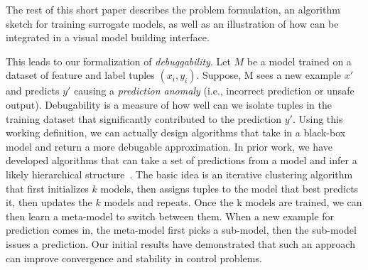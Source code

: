 The rest of this short paper describes the \sys problem formulation, an algorithm sketch for training surrogate models, as well as an illustration of how \sys can be integrated in a visual model building interface.


This leads to our formalization of \emph{debuggability}.
Let $M$ be a model trained on a dataset of feature and label tuples $(x_i,y_i)$.
Suppose, M sees a new example $x'$ and predicts $y'$ causing a \emph{prediction anomaly} (i.e., incorrect prediction or unsafe output).
Debugability is a measure of how well can we isolate tuples in the training dataset that significantly contributed to the prediction $y'$.
Using this working definition, we can actually design algorithms that take in a black-box model and return a more debugable approximation.
In prior work, we have developed algorithms that can take a set of predictions from a model and infer a likely hierarchical structure~\cite{DBLP:journals/corr/KrishnanGLMPG16, Krishnan17}.
The basic idea is an iterative clustering algorithm that first initializes $k$ models, then assigns tuples to the model that best predicts it, then updates the $k$ models and repeats.
Once the k models are trained, we can then learn a meta-model to switch between them.
When a new example for prediction comes in, the meta-model first picks a sub-model, then the sub-model issues a prediction.
Our initial results have demonstrated that such an approach can improve convergence and stability in control problems.
\fi





























